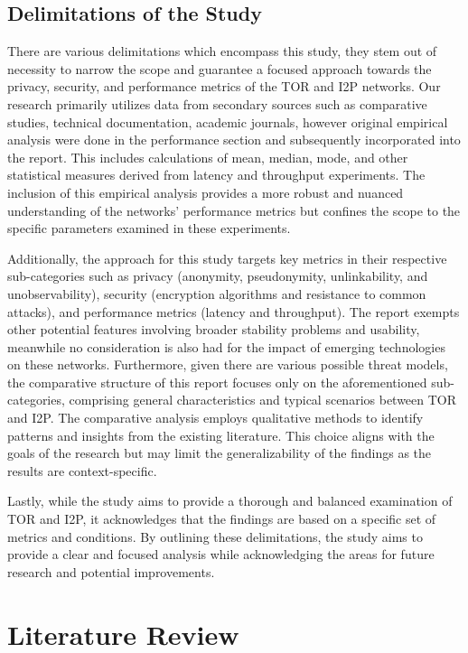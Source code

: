 \documentclass[12pt,conference]{IEEEtran}
\begin{document}
\subsection{Delimitations of the Study}
There are various delimitations which encompass this study, they stem out of necessity to narrow the scope and guarantee a focused approach towards the privacy, security, and performance metrics of the TOR and I2P networks. Our research primarily utilizes data from secondary sources such as comparative studies, technical documentation, academic journals, however original empirical analysis were done in the performance section and subsequently incorporated into the report. This includes calculations of mean, median, mode, and other statistical measures derived from latency and throughput experiments. The inclusion of this empirical analysis provides a more robust and nuanced understanding of the networks' performance metrics but confines the scope to the specific parameters examined in these experiments.

Additionally, the approach for this study targets key metrics in their respective sub-categories such as privacy (anonymity, pseudonymity, unlinkability, and unobservability), security (encryption algorithms and resistance to common attacks), and performance metrics (latency and throughput). The report exempts other potential features involving broader stability problems and usability, meanwhile no consideration is also had for the impact of emerging technologies on these networks. Furthermore, given there are various possible threat models, the comparative structure of this report focuses only on the aforementioned sub-categories, comprising general characteristics and typical scenarios between TOR and I2P. The comparative analysis employs qualitative methods to identify patterns and insights from the existing literature. This choice aligns with the goals of the research but may limit the generalizability of the findings as the results are context-specific.

 Lastly, while the study aims to provide a thorough and balanced examination of TOR and I2P, it acknowledges that the findings are based on a specific set of metrics and conditions. By outlining these delimitations, the study aims to provide a clear and focused analysis while acknowledging the areas for future research and potential improvements.

\section{Literature Review}
\end{document}
